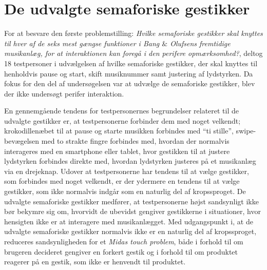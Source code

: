 \section{De udvalgte semaforiske gestikker}
\label{DiskussionUdvalgteGestikker}
%
For at besvare den første problemstilling: \textit{Hvilke semaforiske gestikker skal knyttes til hver af de seks mest gængse funktioner i Bang $\&$ Olufsens fremtidige musikanlæg, for at interaktionen kan foregå i den perifere opmærksomhed?}, deltog 18 testpersoner i udvælgelsen af hvilke semaforiske gestikker, der skal knyttes til henholdvis pause og start, skift musiknummer samt justering af lydstyrken. Da fokus for den del af undersøgelsen var at udvælge de semaforiske gestikker, blev der ikke undersøgt perifer interaktion. 

En gennemgående tendens for testpersonernes begrundelser relateret til de udvalgte gestikker er, at testpersonerne forbinder dem med noget velkendt; krokodillenæbet til at pause og starte musikken forbindes med \enquote{ti stille}, swipe-bevægelsen med to strakte fingre forbindes med, hvordan der normalvis interageres med en smartphone eller tablet, hvor gestikken til at justere lydstyrken forbindes direkte med, hvordan lydstyrken justeres på et musikanlæg via en drejeknap. Udover at testpersonerne har tendens til at vælge gestikker, som forbindes med noget velkendt, er der ydermere en tendens til at vælge gestikker, som ikke normalvis indgår som en naturlig del af kropssproget. De udvalgte semaforiske gestikker medfører, at testpersonerne højst sandsynligt ikke bør bekymre sig om, hvorvidt de ubevidst gengiver gestikkerne i situationer, hvor hensigten ikke er at interagere med musikanlægget. Med udgangspunkt i, at de udvalgte semaforiske gestikker normalvis ikke er en naturlig del af kropssproget, reduceres sandsynligheden for et \textit{Midas touch problem}, både i forhold til om brugeren decideret gengiver en forkert gestik og i forhold til om produktet reagerer på en gestik, som ikke er henvendt til produktet. 

